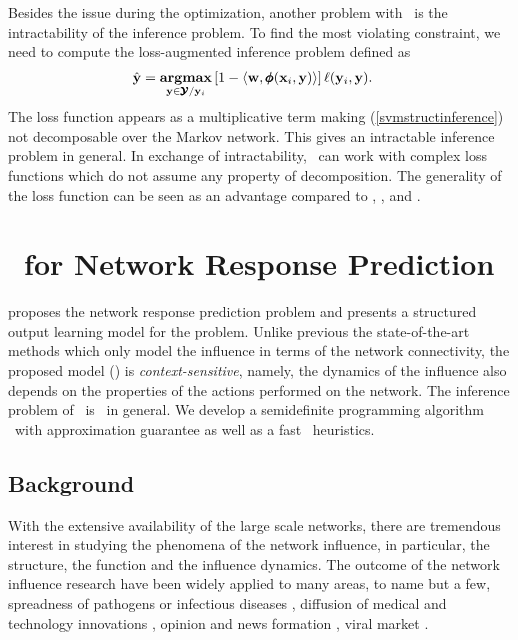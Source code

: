 {Besides the issue during the optimization, another problem with \svmstruct\ is the intractability of the inference problem.
To find the most violating constraint, we need to compute the loss-augmented inference problem \citep{TJTA05} defined as
\begin{align}
	\hat{\mathbf {y}} = \underset{\mathbf {y}\in\pmb {\mathcal{Y}}/\mathbf {y}_i}{\textbf{argmax}} &\, [1-\langle \mathbf {w}, \pmb \phi(\mathbf {x}_i,\mathbf {y}) \rangle]\,\mathbf {\ell}(\mathbf {y}_i,\mathbf {y}). \label{svmstructinference}
\end{align}
The loss function appears as a multiplicative term making (\ref{svmstructinference}) not decomposable over the Markov network.
This gives an intractable inference problem in general.
In exchange of intractability, \svmstruct\ can work with complex loss functions which do not assume any property of decomposition.
The generality of the loss function can be seen as an advantage compared to \crf, \mmmn, and \mmcrf.



%
%
\section{\spin\ for Network Response Prediction} \label{sc_su14a}

 proposes the network response prediction problem and presents a structured output learning model for the problem.
Unlike previous the state-of-the-art methods which only model the influence in terms of the network connectivity, the proposed model (\spin) is \textit{context-sensitive}, namely, the dynamics of the influence also depends on the properties of the actions performed on the network.
The inference problem of \spin\ is \nphard\ in general.
We develop a semidefinite programming algorithm \sdp\ with approximation guarantee as well as a fast \greedy\ heuristics.

\subsection{Background}

With the extensive availability of the large scale networks, there are tremendous interest in studying the phenomena of the network influence, in particular, the structure, the function and the influence dynamics. 
The outcome of the network influence research have been widely applied to many areas, to name but a few, spreadness of pathogens or infectious diseases \citep{Hethcote00the,Anderson02infectious}, diffusion of medical and technology innovations \citep{Strang98diffusion,Rogers03the}, opinion and news formation \citep{Adar04implicit,Gruhl04information,Adar05tracking,Leskovec07cascading,Nowell08tracing,Leskovec09meme}, viral market \citep{Domingos01mining,Kempe03maximizing,Liben-Nowell03the}.

}
